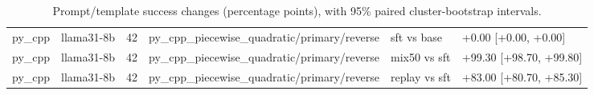 \begin{table}[t]
\begin{tabular}{llllll}
py\_cpp & llama31-8b & 42 & py\_cpp\_piecewise\_quadratic/primary/reverse & sft vs base & +0.00 [+0.00, +0.00] \\
py\_cpp & llama31-8b & 42 & py\_cpp\_piecewise\_quadratic/primary/reverse & mix50 vs sft & +99.30 [+98.70, +99.80] \\
py\_cpp & llama31-8b & 42 & py\_cpp\_piecewise\_quadratic/primary/reverse & replay vs sft & +83.00 [+80.70, +85.30] \\
\bottomrule
\end{tabular}
\caption{Prompt/template success changes (percentage points), with 95\% paired cluster-bootstrap intervals.}
\end{table}
